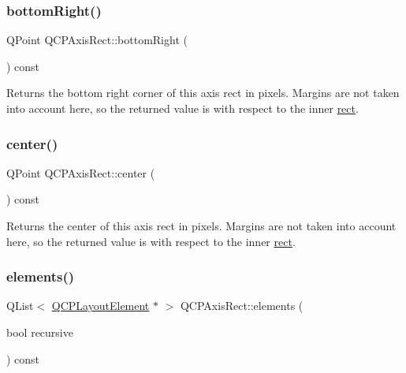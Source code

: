 \subsubsection{\texorpdfstring{bottom\+Right()}{bottomRight()}}
{\footnotesize\ttfamily Q\+Point Q\+C\+P\+Axis\+Rect\+::bottom\+Right (\begin{DoxyParamCaption}{ }\end{DoxyParamCaption}) const\hspace{0.3cm}{\ttfamily [inline]}}

Returns the bottom right corner of this axis rect in pixels. Margins are not taken into account here, so the returned value is with respect to the inner \hyperlink{class_q_c_p_layout_element_a208effccfe2cca4a0eaf9393e60f2dd4}{rect}. \mbox{\label{class_q_c_p_axis_rect_ade3aef874bafcec6dd16174fba44c0b1}} 
\subsubsection{\texorpdfstring{center()}{center()}}
{\footnotesize\ttfamily Q\+Point Q\+C\+P\+Axis\+Rect\+::center (\begin{DoxyParamCaption}{ }\end{DoxyParamCaption}) const\hspace{0.3cm}{\ttfamily [inline]}}

Returns the center of this axis rect in pixels. Margins are not taken into account here, so the returned value is with respect to the inner \hyperlink{class_q_c_p_layout_element_a208effccfe2cca4a0eaf9393e60f2dd4}{rect}. \mbox{\label{class_q_c_p_axis_rect_a3aee067fd105f2fa8de9eb8024435ac5}} 
\subsubsection{\texorpdfstring{elements()}{elements()}}
{\footnotesize\ttfamily Q\+List$<$ \hyperlink{class_q_c_p_layout_element}{Q\+C\+P\+Layout\+Element} $\ast$ $>$ Q\+C\+P\+Axis\+Rect\+::elements (\begin{DoxyParamCaption}\item[{bool}]{recursive }\end{DoxyParamCaption}) const\hspace{0.3cm}{\ttfamily [virtual]}}


